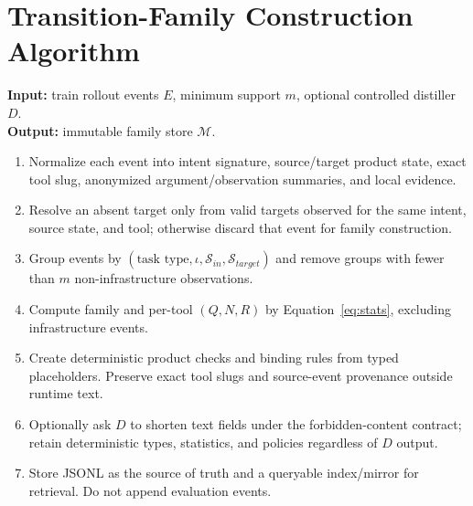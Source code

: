 \documentclass[10pt]{article}
\newcommand{\state}{\mathcal{S}}
\begin{document}
\section{Transition-Family Construction Algorithm}
\noindent\textbf{Input:} train rollout events $E$, minimum support $m$, optional controlled distiller $D$.\\
\textbf{Output:} immutable family store $\mathcal{M}$.\\
\begin{enumerate}
\item Normalize each event into intent signature, source/target product state, exact tool slug, anonymized argument/observation summaries, and local evidence.
\item Resolve an absent target only from valid targets observed for the same intent, source state, and tool; otherwise discard that event for family construction.
\item Group events by $(\text{task type},\iota,\state_{in},\state_{target})$ and remove groups with fewer than $m$ non-infrastructure observations.
\item Compute family and per-tool $(Q,N,R)$ by Equation~\ref{eq:stats}, excluding infrastructure events.
\item Create deterministic product checks and binding rules from typed placeholders. Preserve exact tool slugs and source-event provenance outside runtime text.
\item Optionally ask $D$ to shorten text fields under the forbidden-content contract; retain deterministic types, statistics, and policies regardless of $D$ output.
\item Store JSONL as the source of truth and a queryable index/mirror for retrieval. Do not append evaluation events.
\end{enumerate}
\end{document}
